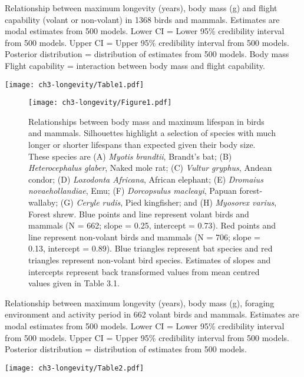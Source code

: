 \vspace{10 mm}

\begin{table}[h]
  \caption[ ]{Relationship between maximum longevity (years), body mass (g) and flight capability (volant or non-volant) in 1368 birds and mammals. Estimates are modal estimates from 500 models. Lower CI = Lower 95\% credibility interval from 500 models. Upper CI = Upper 95\% credibility interval from 500 models. Posterior distribution = distribution of estimates from 500 models. Body mass \: Flight capability = interaction between body mass and flight capability.}
  \label{tbl:Table 3.1.}
  \texttt{[image: ch3-longevity/Table1.pdf]}
\end{table}


\begin{figure}[p!]
  \centering
  \texttt{[image: ch3-longevity/Figure1.pdf]}
  \caption[ ]{Relationships between body mass and maximum lifespan in birds and mammals. Silhouettes highlight a selection of species with much longer or shorter lifespans than expected given their body size. These species are (A) \textit{Myotis brandtii}, Brandt's bat; (B) \textit{Heterocephalus glaber}, Naked mole rat; (C) \textit{Vultur gryphus}, Andean condor; (D) \textit{Loxodonta Africana}, African elephant; (E) \textit{Dromaius novaehollandiae}, Emu; (F) \textit{Dorcopsulus macleayi}, Papuan forest-wallaby; (G) \textit{Ceryle rudis}, Pied kingfisher; and (H) \textit{Myosorex varius}, Forest shrew. Blue points and line represent volant birds and mammals (N = 662; slope = 0.25, intercept = 0.73). Red points and line represent non-volant birds and mammals (N = 706; slope = 0.13, intercept = 0.89). Blue triangles represent bat species and red triangles represent non-volant bird species. Estimates of slopes and intercepts represent back transformed values from mean centred values given in Table 3.1.}
  \label{figure:Figure 3.1.}
\end{figure}


\begin{table}[H]
  \caption[ ]{Relationship between maximum longevity (years), body mass (g), foraging environment and activity period in 662 volant birds and mammals. Estimates are modal estimates from 500 models. Lower CI = Lower 95\% credibility interval from 500 models. Upper CI = Upper 95\% credibility interval from 500 models. Posterior distribution = distribution of estimates from 500 models.}
  \label{tbl:Table 3.2.}
  \texttt{[image: ch3-longevity/Table2.pdf]}
\end{table}


